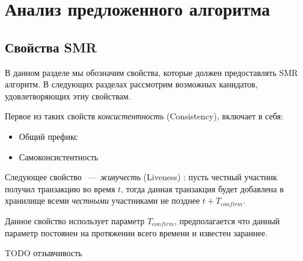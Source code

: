 
\chapter{Анализ предложенного алгоритма}  \label{chapter3}

\section{Свойства SMR}
В данном разделе мы обозначим свойства, которые должен предоставлять SMR алгоритм.
В следующих разделах рассмотрим возможных канидатов, удовлетворяющих этиу свойствам.

Первое из таких свойств \textit{консистентность} (Consistency)\cite{hybrid-consensus}, включает в себя:
\begin{itemize}
\item Общий префикс
\item Самоконсистентность
\end{itemize}

\noindent Следующее свойство ~--- \textit{живучесть} (Liveness) \cite{hybrid-consensus}:
пусть честный участник получил транзакцию во время $t$, тогда данная транзакция будет добавлена в хранилище всеми \textit{честными} участниками не позднее $t + T_{confirm}$.

Данное свойство использует параметр $T_{confirm}$, предполагается что данный параметр постоянен на протяжении всего времени и известен зараннее.

TODO отзывчивость